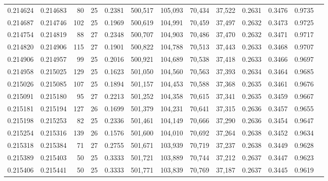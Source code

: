 \begin{tabular}{rrrrrrrrrrrrr}
0.214624 & 0.214683 &  80 &  25 &                                     0.2381 & 500,517 & 105,093 &  70,434 &  37,522 & 0.2631 & 0.3476 & 0.9735 \\
0.214687 & 0.214746 & 102 &  25 &                                     0.1969 & 500,619 & 104,991 &  70,459 &  37,497 & 0.2632 & 0.3473 & 0.9725 \\
0.214754 & 0.214819 &  88 &  27 &                                     0.2348 & 500,707 & 104,903 &  70,486 &  37,470 & 0.2632 & 0.3471 & 0.9717 \\
0.214820 & 0.214906 & 115 &  27 &                                     0.1901 & 500,822 & 104,788 &  70,513 &  37,443 & 0.2633 & 0.3468 & 0.9707 \\
0.214906 & 0.214957 &  99 &  25 &                                     0.2016 & 500,921 & 104,689 &  70,538 &  37,418 & 0.2633 & 0.3466 & 0.9697 \\
0.214958 & 0.215025 & 129 &  25 &                                     0.1623 & 501,050 & 104,560 &  70,563 &  37,393 & 0.2634 & 0.3464 & 0.9685 \\
0.215026 & 0.215085 & 107 &  25 &                                     0.1894 & 501,157 & 104,453 &  70,588 &  37,368 & 0.2635 & 0.3461 & 0.9676 \\
0.215091 & 0.215180 &  95 &  27 &                                     0.2213 & 501,252 & 104,358 &  70,615 &  37,341 & 0.2635 & 0.3459 & 0.9667 \\
0.215181 & 0.215194 & 127 &  26 &                                     0.1699 & 501,379 & 104,231 &  70,641 &  37,315 & 0.2636 & 0.3457 & 0.9655 \\
0.215198 & 0.215253 &  82 &  25 &                                     0.2336 & 501,461 & 104,149 &  70,666 &  37,290 & 0.2636 & 0.3454 & 0.9647 \\
0.215254 & 0.215316 & 139 &  26 &                                     0.1576 & 501,600 & 104,010 &  70,692 &  37,264 & 0.2638 & 0.3452 & 0.9634 \\
0.215318 & 0.215384 &  71 &  27 &                                     0.2755 & 501,671 & 103,939 &  70,719 &  37,237 & 0.2638 & 0.3449 & 0.9628 \\
0.215389 & 0.215403 &  50 &  25 &                                     0.3333 & 501,721 & 103,889 &  70,744 &  37,212 & 0.2637 & 0.3447 & 0.9623 \\
0.215406 & 0.215441 &  50 &  25 &                                     0.3333 & 501,771 & 103,839 &  70,769 &  37,187 & 0.2637 & 0.3445 & 0.9619 \\

\end{tabular}
